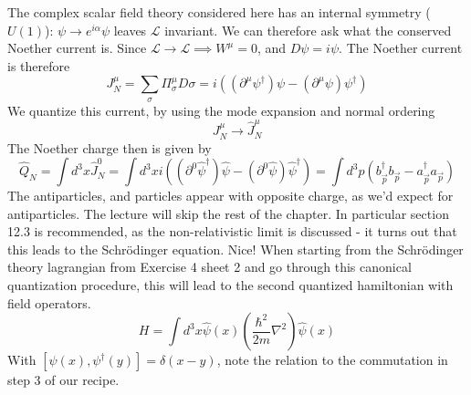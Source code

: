 \documentclass{report}
\begin{document}
The complex scalar field theory considered here has an internal symmetry ($U(1)$):  $\psi \to e^{i\alpha} \psi$ leaves $\mathcal{L}$ invariant. We can therefore ask what the conserved Noether current is. Since $\mathcal{L} \to \mathcal{L} \implies W^\mu = 0$, and $D\psi = i \psi$. The Noether current is therefore \[
	J_N^\mu = \sum_{\sigma} \Pi_\sigma^\mu D\sigma = i \left( (\partial^\mu \psi^\dagger) \psi - (\partial^\mu \psi)\psi^\dagger \right) 
\] We quantize this current, by using the mode expansion and normal ordering \[
J_N^\mu \to \hat{J}_N^\mu
\] The Noether charge then is given by \[
\hat{Q}_N = \int d^3x \hat{J}_N^0 = \int d^3x i \left( (\partial^0 \hat{\psi}^\dagger) \hat{\psi} - (\partial^0 \hat{\psi })\hat{\psi}^\dagger \right) = \int d^3p \left( b_{\vec{p}}^\dagger b_{\vec{p}} - a_{\vec{p}}^\dagger a_{\vec{p}} \right) 
\] The antiparticles, and particles appear with opposite charge, as we'd expect for antiparticles.
The lecture will skip the rest of the chapter. In particular section 12.3 is recommended, as the non-relativistic limit is discussed - it turns out that this leads to the Schrödinger equation. Nice! When starting from the Schrödinger theory lagrangian from Exercise 4 sheet 2 and go through this canonical quantization procedure, this will lead to the second quantized hamiltonian with field operators. \[
	H = \int d^3x \hat{\psi }(x) \left( \frac{\hbar^2}{2m} \nabla^2 \right) \hat{\psi }(x)
\] With $[\psi(x), \psi^\dagger(y)] = \delta(x-y)$, note the relation to the commutation in step 3 of our recipe.
\end{document}
